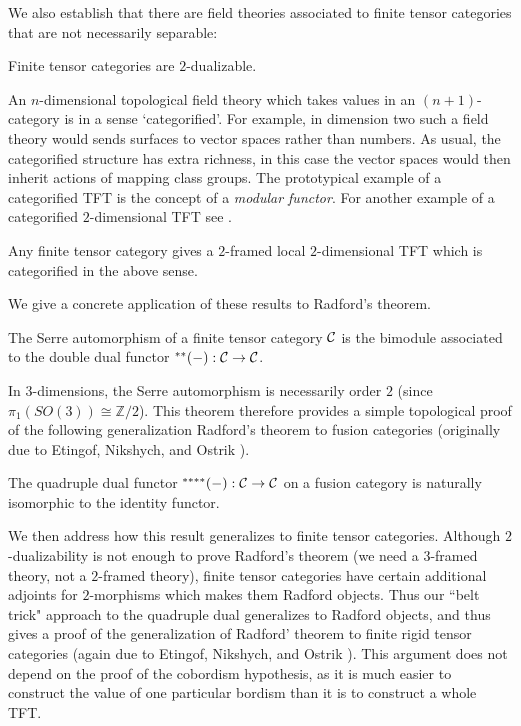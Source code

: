 \documentclass{amsart}
\begin{document}
We also establish that there are field theories associated to finite tensor categories that are not necessarily separable:

\begin{maintheorem} \label{thm4}
Finite tensor categories are $2$-dualizable.
\end{maintheorem}

An $n$-dimensional topological field theory which takes values in an $(n+1)$-category is in a sense `categorified'.  For example, in dimension two such a field theory would sends surfaces to vector spaces rather than numbers.  As usual, the categorified structure has extra richness, in this case the vector spaces would then inherit actions of mapping class groups. The prototypical example of a categorified TFT is the concept of a {\em modular functor}.  For another example of a categorified $2$-dimensional TFT see \cite{0904.1247}.

\begin{maincor} \label{cor5}
Any finite tensor category gives a $2$-framed local $2$-dimensional TFT which is categorified in the above sense. 
\end{maincor}

We give a concrete application of these results to Radford's theorem.

\begin{maintheorem} \label{thm6}
The Serre automorphism of a finite tensor category $\mathcal C$ is the bimodule associated to the double dual functor ${}^{**}(-): \mathcal C \rightarrow \mathcal C$.  %
\end{maintheorem}

In $3$-dimensions, the Serre automorphism is necessarily order $2$ (since $\pi_1(SO(3)) \cong \mathbb{Z}/2$). This theorem therefore provides a simple topological proof of the following generalization Radford's theorem \cite{MR0407069} to fusion categories (originally due to Etingof, Nikshych, and Ostrik \cite{MR2183279}).
\begin{maincor} \label{cor7}
The quadruple dual functor ${}^{****}(-): \mathcal C \rightarrow \mathcal C$ on a fusion category is naturally isomorphic to the identity functor.
\end{maincor}

We then address how this result generalizes to finite tensor categories.  Although $2$-dualizability is not enough to prove Radford's theorem  (we need a $3$-framed theory, not a $2$-framed theory), finite tensor categories have certain additional adjoints for $2$-morphisms which makes them Radford objects.  Thus our ``belt trick" approach to the quadruple dual generalizes to Radford objects, and thus gives a proof of the generalization of Radford' theorem to finite rigid tensor categories (again due to Etingof, Nikshych, and Ostrik \cite{MR2097289}).  This argument does not depend on the proof of the cobordism hypothesis, as it is much easier to construct the value of one particular bordism than it is to construct a whole TFT.
\end{document}
